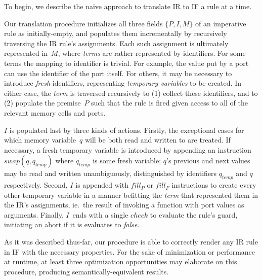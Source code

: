 To begin, we describe the na\"ive approach to translate IR to IF a rule at a time.

Our translation procedure initializes all three fields $\{P, I, M\}$ of an imperative rule as initially-empty, and populates them incrementally by recursively traversing the IR rule's assignments. Each such assignment is ultimately represented in~$M$, where \textit{terms} are rather represented by identifiers. For some terms the mapping to identifier is trivial. For example, the value put by a port can use the identifier of the port itself. For others, it may be necessary to introduce \textit{fresh} identifiers, representing \textit{temporary variables} to be created. In either case, the \textit{term} is traversed recursively to (1) collect these identifiers, and to (2) populate the premise~$P$ such that the rule is fired given access to all of the relevant memory cells and ports.

$I$ is populated last by three kinds of actions. Firstly, the exceptional cases for which memory variable~$q$ will be both read and written to are treated. If necessary, a fresh temporary variable is introduced by appending an instruction $swap(q, q_{temp})$ where $q_{temp}$ is some fresh variable; $q$'s previous and next values may be read and written unambiguously, distinguished by identifiers $q_{temp}$ and $q$ respectively. Second, $I$ is appended with $fill_P$ or $fill_F$ instructions to create every other temporary variable in a manner befitting the \textit{term} that represented them in the IR's assignments, ie.\ the result of invoking a function with port values as arguments. Finally, $I$~ends with a single $check$ to evaluate the rule's guard, initiating an abort if it is evaluates to \textit{false}.

As it was described thus-far, our procedure is able to correctly render any IR rule in IF with the necessary properties. For the sake of minimization or performance at runtime, at least three optimization opportunities may elaborate on this procedure, producing semantically-equivalent results.

